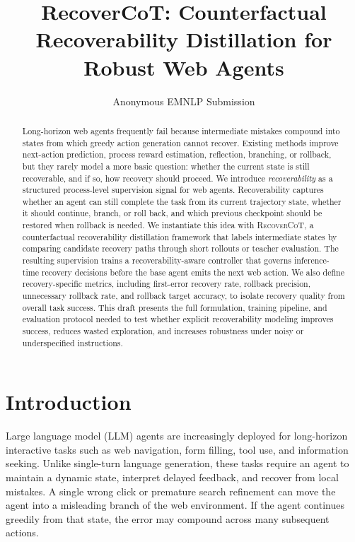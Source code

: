 \documentclass[11pt]{article}
\title{RecoverCoT: Counterfactual Recoverability Distillation for Robust Web Agents}
\author{Anonymous EMNLP Submission}
\begin{document}
\maketitle

\begin{abstract}
Long-horizon web agents frequently fail because intermediate mistakes compound into states from which greedy action generation cannot recover. Existing methods improve next-action prediction, process reward estimation, reflection, branching, or rollback, but they rarely model a more basic question: whether the current state is still recoverable, and if so, how recovery should proceed. We introduce \textit{recoverability} as a structured process-level supervision signal for web agents. Recoverability captures whether an agent can still complete the task from its current trajectory state, whether it should continue, branch, or roll back, and which previous checkpoint should be restored when rollback is needed. We instantiate this idea with \textsc{RecoverCoT}, a counterfactual recoverability distillation framework that labels intermediate states by comparing candidate recovery paths through short rollouts or teacher evaluation. The resulting supervision trains a recoverability-aware controller that governs inference-time recovery decisions before the base agent emits the next web action. We also define recovery-specific metrics, including first-error recovery rate, rollback precision, unnecessary rollback rate, and rollback target accuracy, to isolate recovery quality from overall task success. This draft presents the full formulation, training pipeline, and evaluation protocol needed to test whether explicit recoverability modeling improves success, reduces wasted exploration, and increases robustness under noisy or underspecified instructions.
\end{abstract}

\section{Introduction}
Large language model (LLM) agents are increasingly deployed for long-horizon interactive tasks such as web navigation, form filling, tool use, and information seeking. Unlike single-turn language generation, these tasks require an agent to maintain a dynamic state, interpret delayed feedback, and recover from local mistakes. A single wrong click or premature search refinement can move the agent into a misleading branch of the web environment. If the agent continues greedily from that state, the error may compound across many subsequent actions.
\end{document}
